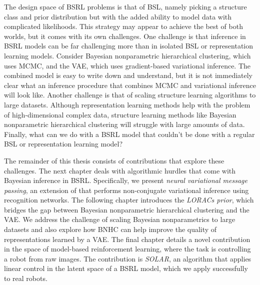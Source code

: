 The design space of BSRL problems
is that of BSL, namely
picking a structure class
and prior distribution
but with the added ability
to model data
with complicated likelihoods.
This strategy may appear to
achieve the best of both worlds,
but it comes
with its own challenges.
One challenge is that inference in BSRL models
can be far challenging
more than in isolated BSL or representation
learning models. Consider Bayesian
nonparametric hierarchical clustering,
which uses MCMC, and the VAE,
which uses gradient-based variational
inference. The combined model
is easy to write down and understand,
but it is not immediately clear
what an inference procedure that combines
MCMC and variational inference
will look like. Another challenge 
is that of scaling structure learning
algorithms to large datasets. Although
representation learning methods help
with the problem of high-dimensional
complex data, structure learning methods
like Bayesian nonparametric hierarchical clustering
will struggle with large amounts of data.
Finally, what can we do with a BSRL model
that couldn't be done with a regular BSL or representation
learning model?

The remainder of this thesis
consists of contributions that
explore these challenges.
The next chapter deals with algorithmic
hurdles that come with Bayesian
inference in BSRL. Specifically,
we present \emph{neural variational message
passing}, an extension of \citet{Johnson2016}
that performs non-conjugate variational inference 
using recognition networks.
The following chapter introduces
the \emph{LORACs prior}, which
bridges the gap between
Bayesian nonparametric
hierarchical clustering and the VAE.
We address the challenge of scaling
Bayesian nonparametrics to large datasets
and also explore how BNHC can help improve
the quality of representations learned
by a VAE.
The final chapter details a novel
contribution in the space
of model-based reinforcement learning, where
the task is controlling a robot from raw images.
The contribution is \emph{SOLAR}, an algorithm
that applies linear control
in the latent space of a BSRL model,
which we apply successfully to real robots.
